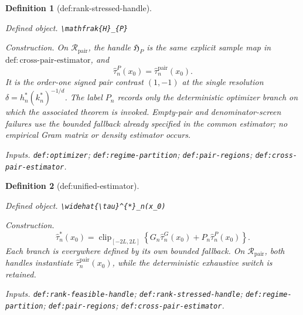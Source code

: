 \documentclass{article}
\newtheorem{definition}{Definition}
\begin{document}
\begin{definition}[def:rank-stressed-handle]\label{def:rank-stressed-handle}
\par\smallskip\noindent\emph{Defined object.} \texttt{\textbackslash{}\allowbreak{}mathfrak\{H\}\allowbreak{}\_\allowbreak{}\{P\}\allowbreak{}}
\par\smallskip\noindent\emph{Construction.} On \(\mathcal R_{\mathrm{pair}}\), the handle \(\mathfrak H_P\) is the same explicit sample map in \(\mathrm{def:cross\mbox{-}pair\mbox{-}estimator}\), and
\[
 \widehat\tau_n^P(x_0)=\widehat\tau_n^{\mathrm{pair}}(x_0).
\]
It is the order-one signed pair contrast \((1,-1)\) at the single resolution \(\delta=h_n^*(k_n^*)^{-1/d}\).  The label \(P_n\) records only the deterministic optimizer branch on which the associated theorem is invoked.  Empty-pair and denominator-screen failures use the bounded fallback already specified in the common estimator; no empirical Gram matrix or density estimator occurs.
\par\smallskip\noindent\emph{Inputs.} \texttt{def:\allowbreak{}optimizer}; \texttt{def:\allowbreak{}regime-\allowbreak{}partition}; \texttt{def:\allowbreak{}pair-\allowbreak{}regions}; \texttt{def:\allowbreak{}cross-\allowbreak{}pair-\allowbreak{}estimator}.
\end{definition}

\begin{definition}[def:unified-estimator]\label{def:unified-estimator}
\par\smallskip\noindent\emph{Defined object.} \texttt{\textbackslash{}\allowbreak{}widehat\{\textbackslash{}\allowbreak{}tau\}\allowbreak{}\textasciicircum{}\{*\}\allowbreak{}\_\allowbreak{}n(x\_\allowbreak{}0)}
\par\smallskip\noindent\emph{Construction.} \[
 \widehat\tau_n^*(x_0)=\operatorname{clip}_{[-2L,2L]}
 \left\{G_n\widehat\tau_n^G(x_0)+P_n\widehat\tau_n^P(x_0)\right\}.
\]
Each branch is everywhere defined by its own bounded fallback.  On \(\mathcal R_{\mathrm{pair}}\), both handles instantiate \(\widehat\tau_n^{\mathrm{pair}}(x_0)\), while the deterministic exhaustive switch is retained.
\par\smallskip\noindent\emph{Inputs.} \texttt{def:\allowbreak{}rank-\allowbreak{}feasible-\allowbreak{}handle}; \texttt{def:\allowbreak{}rank-\allowbreak{}stressed-\allowbreak{}handle}; \texttt{def:\allowbreak{}regime-\allowbreak{}partition}; \texttt{def:\allowbreak{}pair-\allowbreak{}regions}; \texttt{def:\allowbreak{}cross-\allowbreak{}pair-\allowbreak{}estimator}.
\end{definition}
\end{document}
